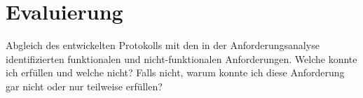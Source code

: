 \chapter{Evaluierung}

Abgleich des entwickelten Protokolls mit den in der Anforderungsanalyse identifizierten funktionalen und
nicht-funktionalen Anforderungen. Welche konnte ich erfüllen und welche nicht? Falls nicht, warum
konnte ich diese Anforderung gar nicht oder nur teilweise erfüllen?